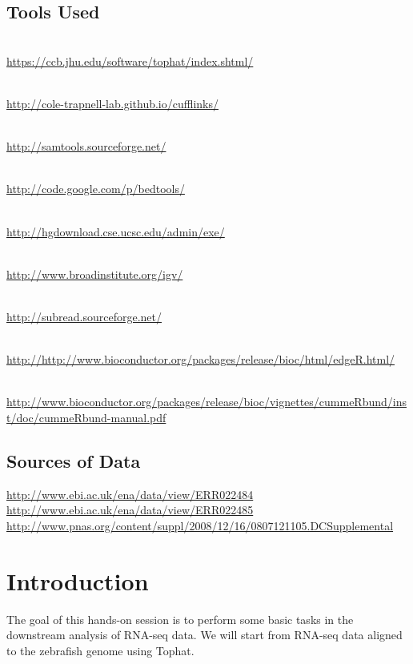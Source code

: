 \subsection{Tools Used}
\begin{description}[style=multiline,labelindent=0cm,align=left,leftmargin=1cm]
  \item[Tophat] \hfill\\
    \url{https://ccb.jhu.edu/software/tophat/index.shtml/}
  \item[Cufflinks] \hfill\\
    \url{http://cole-trapnell-lab.github.io/cufflinks/}
  \item[Samtools] \hfill\\
    \url{http://samtools.sourceforge.net/}
  \item[BEDTools] \hfill\\
    \url{http://code.google.com/p/bedtools/}
  \item[UCSC tools] \hfill\\
    \url{http://hgdownload.cse.ucsc.edu/admin/exe/}
  \item[IGV] \hfill\\
    \url{http://www.broadinstitute.org/igv/}
  \item[FeatureCount] \hfill\\
    \url{http://subread.sourceforge.net/}
  \item[edgeR pakcage] \hfill\\
    \url{http://http://www.bioconductor.org/packages/release/bioc/html/edgeR.html/}
  \item[CummeRbund manual] \hfill\\
    \url{http://www.bioconductor.org/packages/release/bioc/vignettes/cummeRbund/inst/doc/cummeRbund-manual.pdf}
\end{description}

\subsection{Sources of Data}
\url{http://www.ebi.ac.uk/ena/data/view/ERR022484}\\
\url{http://www.ebi.ac.uk/ena/data/view/ERR022485}\\
\url{http://www.pnas.org/content/suppl/2008/12/16/0807121105.DCSupplemental}

\newpage

\section{Introduction}
The goal of this hands-on session is to perform some basic tasks in the
downstream analysis of RNA-seq data. We will start from RNA-seq data aligned to
the zebrafish genome using Tophat.

